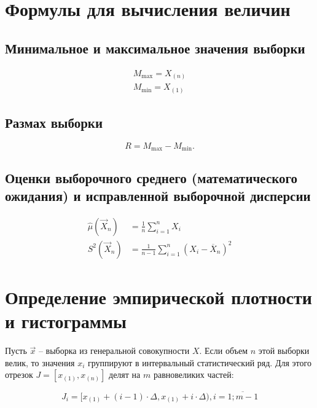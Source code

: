 \documentclass[12pt]{report}
\begin{document}
\section*{Формулы для вычисления величин}

\subsection*{Минимальное и максимальное значения выборки}
\begin{equation}
	\begin{aligned}
		M_{\max} = X_{(n)}\\
		M_{\min} = X_{(1)}
	\end{aligned}
\end{equation}

\subsection*{Размах выборки}
\begin{equation}
	R = M_{\max} - M_{\min}.
\end{equation}

\subsection*{Оценки выборочного среднего (математического ожидания) и исправленной выборочной дисперсии}
\begin{equation}
	\begin{aligned}
		\hat\mu(\vec X_n) &= \frac 1n \sum_{i=1}^n X_i\\
		S^2(\vec X_n) &= \frac 1{n-1} \sum_{i=1}^n (X_i-\overline X_n)^2
	\end{aligned}
\end{equation}

\section*{Определение эмпирической плотности и гистограммы}

Пусть $\vec x$ -- выборка из генеральной совокупности $X$. Если объем $n$ этой выборки велик, то значения $x_i$ группируют в интервальный статистический ряд. Для этого отрезок $J = [x_{(1)}, x_{(n)}]$ делят на $m$ равновеликих частей:

\begin{equation*}
	J_i = [x_{(1)} + (i - 1) \cdot \Delta, x_{(1)} + i \cdot \Delta), i = \overline{1; m - 1}
\end{equation*}
\end{document}
